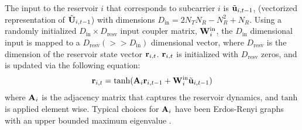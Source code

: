 \documentclass[conference]{IEEEtran}
\begin{document}
The input to the reservoir $i$ that corresponds to subcarrier $i$ is $\tilde{{\bf u}}_{i,t-1}$, (vectorized representation of $\tilde{{\bf U}}_{i,t-1}$) with dimensions $D_{\text{in}}=2N_TN_R-N_R^2+N_R$.
Using a randomly initialized $D_{\text{in}}\times D_{\text{resv}}$ input coupler matrix, ${\bf W}^{\text{in}}_i$, the $D_{\text{in}}$ dimensional input is mapped to a $D_{\text{resv}}(>>D_{\text{in}})$ dimensional vector, where $D_{\text{resv}}$ is the dimension of the reservoir state vector ${\bf r}_{i,t}$. ${\bf r}_{i,t}$ is initialized with $D_{\text{resv}}$ zeros, and is updated via the following equation:
\begin{equation}
\br_{i,t}=\text{tanh}(\bA_i\br_{i,t-1}+\bW^{\text{in}}_i\tilde{\bu}_{i,t-1})
\label{res_upd}
\end{equation}
where ${\bf A}_i$ is the adjacency matrix that captures the reservoir dynamics, and $\text{tanh}$ is applied element wise.
Typical choices for ${\bf A}_i$ have been Erdos-Renyi graphs with an upper bounded maximum eigenvalue \cite{mosleh2017brain,pathak2017using}.
\end{document}
